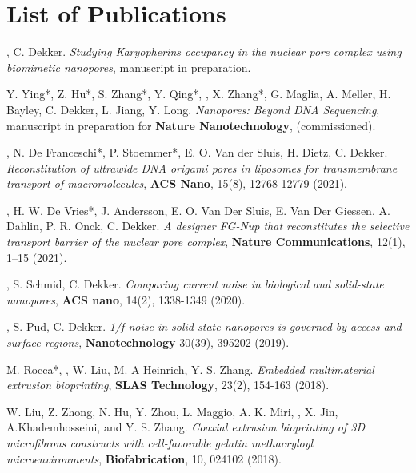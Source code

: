 \chapter*{List of Publications}
\label{publications}

\begin{etaremune}{\small
\item \underline{}, C. Dekker. \textit{Studying Karyopherins occupancy in the nuclear pore complex using biomimetic nanopores}, {manuscript in preparation}.	
\item Y. Ying*, Z. Hu*, S. Zhang*, Y. Qing*, \underline{}, X. Zhang*, G. Maglia, A. Meller, H. Bayley, C. Dekker, L. Jiang, Y. Long. \textit{Nanopores: Beyond DNA Sequencing}, manuscript in preparation for \textbf{Nature Nanotechnology}, (commissioned).		
\item \underline{}, N. De Franceschi*, P. Stoemmer*, E. O. Van der Sluis, H. Dietz, C. Dekker. \textit{Reconstitution of ultrawide DNA origami pores in liposomes for transmembrane transport of macromolecules}, \textbf{ACS Nano}, 15(8), 12768-12779 (2021).
\item \underline{}, H. W. De Vries*, J. Andersson, E. O. Van Der Sluis, E. Van Der Giessen, A. Dahlin, P. R. Onck, C. Dekker. \textit{A designer FG-Nup that reconstitutes the selective transport barrier of the nuclear pore complex}, \textbf{Nature Communications}, 12(1), 1–15 (2021).
\item \underline{}, S. Schmid, C. Dekker. \textit{Comparing current noise in biological and solid-state nanopores}, \textbf{ACS nano}, 14(2), 1338-1349 (2020).
\item \underline{}, S. Pud, C. Dekker. \textit{1/f noise in solid-state nanopores is governed by access and surface regions}, \textbf{Nanotechnology}  30(39), 395202 (2019).
\item M. Rocca*, \underline{}, W. Liu, M. A Heinrich, Y. S. Zhang. \textit{Embedded multimaterial extrusion bioprinting}, \textbf{SLAS Technology}, 23(2), 154-163 (2018).
\item W. Liu, Z. Zhong, N. Hu, Y. Zhou, L. Maggio, A. K. Miri, \underline{}, X. Jin, A.Khademhosseini, and Y. S. Zhang. \textit{Coaxial extrusion bioprinting of 3D microfibrous constructs with cell-favorable gelatin methacryloyl microenvironments}, \textbf{Biofabrication}, 10, 024102 (2018).
}\end{etaremune}


